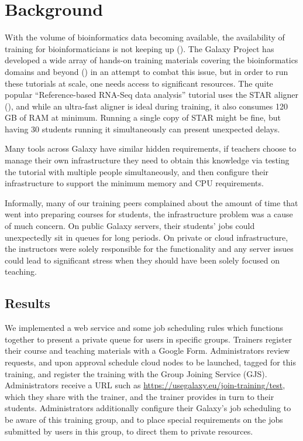 \documentclass[a4paper,num-refs]{oup-contemporary}
\begin{document}
\section{Background}
\label{sec:background}


With the volume of bioinformatics data becoming available, the availability of training for bioinformaticians is not keeping up (\cite{Attwood2017}). The Galaxy Project has developed a wide array of hands-on training materials covering the bioinformatics domains and beyond (\cite{gtn}) in an attempt to combat this issue, but in order to run these tutorials at scale, one needs access to significant resources. The quite popular ``Reference-based RNA-Seq data analysis'' tutorial uses the STAR aligner (\cite{Dobin2012}), and while an ultra-fast aligner is ideal during training, it also consumes 120 GB of RAM at minimum. Running a single copy of STAR might be fine, but having 30 students running it simultaneously can present unexpected delays. 

Many tools across Galaxy have similar hidden requirements, if teachers choose to manage their own infrastructure they need to obtain this knowledge via testing the tutorial with multiple people simultaneously, and then configure their infrastructure to support the minimum memory and CPU requirements.

Informally, many of our training peers complained about the amount of time that went into preparing courses for students, the infrastructure problem was a cause of much concern. On public Galaxy servers, their students' jobs could unexpectedly sit in queues for long periods. On private or cloud infrastructure, the instructors were solely responsible for the functionality and any server issues could lead to significant stress when they should have been solely focused on teaching.

\subsection{Results}
We implemented a web service and some job scheduling rules which functions together to present a private queue for users in specific groups. Trainers register their course and teaching materials with a Google Form. Administrators review requests, and upon approval schedule cloud nodes to be launched, tagged for this training, and register the training with the Group Joining Service (GJS). Administrators receive a URL such as \url{https://usegalaxy.eu/join-training/test}, which they share with the trainer, and the trainer provides in turn to their students. Administrators additionally configure their Galaxy's job scheduling to be aware of this training group, and to place special requirements on the jobs submitted by users in this group, to direct them to private resources.
\end{document}
